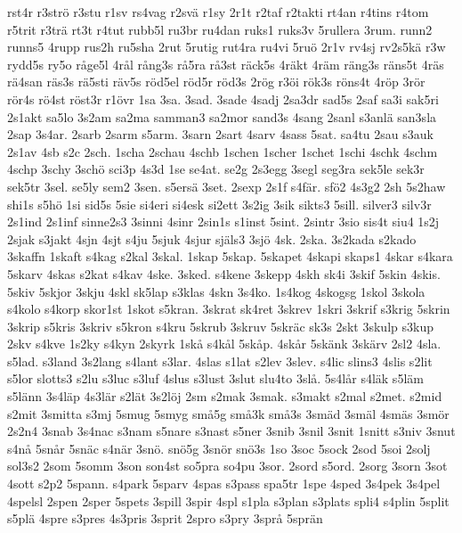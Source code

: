 {{rst4r
r3str^^f6
r3stu
r1sv
rs4vag
r2sv^^e4
r1sy
2r1t
r2taf
r2takti
rt4an
r4tins
r4tom
r5trit
r3tr^^e4
rt3t
r4tut
rubb5l
ru3br
ru4dan
ruks1
ruks3v
5rullera
3rum.
runn2
runns5
4rupp
rus2h
ru5sha
2rut
5rutig
rut4ra
ru4vi
5ru^^f6
2r1v
rv4sj
rv2s5k^^e4
r3w
rydd5s
ry5o
r^^e5ge5l
4r^^e5l
r^^e5ng3s
r^^e55ra
r^^e53st
r^^e4ck5s
4r^^e4kt
4r^^e4m
r^^e4ng3s
r^^e4ns5t
4r^^e4s
r^^e44san
r^^e4s3s
r^^e45sti
r^^e4v5s
r^^f6d5el
r^^f6d5r
r^^f6d3s
2r^^f6g
r3^^f6i
r^^f6k3s
r^^f6ns4t
4r^^f6p
3r^^f6r
r^^f6r4s
r^^f64st
r^^f6st3r
r1^^f6vr
1sa
3sa.
3sad.
3sade
4sadj
2sa3dr
sad5s
2saf
sa3i
sak5ri
2s1akt
sa5lo
3s2am
sa2ma
samman3
sa2mor
sand3s
4sang
2sanl
s3anl^^e4
san3sla
2sap
3s4ar.
2sarb
2sarm
s5arm.
3sarn
2sart
4sarv
4sass
5sat.
sa4tu
2sau
s3auk
2s1av
4sb
s2c
2sch.
1scha
2schau
4schb
1schen
1scher
1schet
1schi
4schk
4schm
4schp
3schy
3sch^^f6
sci3p
4s3d
1se
se4at.
se2g
2s3egg
3segl
seg3ra
sek5le
sek3r
sek5tr
3sel.
se5ly
sem2
3sen.
s5ers^^e4
3set.
2sexp
2s1f
s4f^^e4r.
sf^^f62
4s3g2
2sh
5s2haw
shi1s
s5h^^f6
1si
sid5s
5sie
si4eri
si4esk
si2ett
3s2ig
3sik
sikts3
5sill.
silver3
silv3r
2s1ind
2s1inf
sinne2s3
3sinni
4sinr
2sin1s
s1inst
5sint.
2sintr
3sio
sis4t
siu4
1s2j
2sjak
s3jakt
4sjn
4sjt
s4ju
5sjuk
4sjur
sj^^e4ls3
3sj^^f6
4sk.
2ska.
3s2kada
s2kado
3skaffn
1skaft
s4kag
s2kal
3skal.
1skap
5skap.
5skapet
4skapi
skaps1
4skar
s4kara
5skarv
4skas
s2kat
s4kav
4ske.
3sked.
s4kene
3skepp
4skh
sk4i
3skif
5skin
4skis.
5skiv
5skjor
3skju
4skl
sk5lap
s3klas
4skn
3s4ko.
1s4kog
4skogsg
1skol
3skola
s4kolo
s4korp
skor1st
1skot
s5kran.
3skrat
sk4ret
3skrev
1skri
3skrif
s3krig
5skrin
3skrip
s5kris
3skriv
s5kron
s4kru
5skrub
3skruv
5skr^^e4c
sk3s
2skt
3skulp
s3kup
2skv
s4kve
1s2ky
s4kyn
2skyrk
1sk^^e5
s4k^^e5l
5sk^^e5p.
4sk^^e5r
5sk^^e4nk
3sk^^e4rv
2sl2
4sla.
s5lad.
s3land
3s2lang
s4lant
s3lar.
4slas
s1lat
s2lev
3slev.
s4lic
slins3
4slis
s2lit
s5lor
slotts3
s2lu
s3luc
s3luf
4slus
s3lust
3slut
slu4to
3sl^^e5.
5s4l^^e5r
s4l^^e4k
s5l^^e4m
s5l^^e4nn
3s4l^^e4p
4s3l^^e4r
s2l^^e4t
3s2l^^f6j
2sm
s2mak
3smak.
s3makt
s2mal
s2met.
s2mid
s2mit
3smitta
s3mj
5smug
5smyg
sm^^e55g
sm^^e53k
sm^^e53s
3sm^^e4d
3sm^^e4l
4sm^^e4s
3sm^^f6r
2s2n4
3snab
3s4nac
s3nam
s5nare
s3nast
s5ner
3snib
3snil
3snit
1snitt
s3niv
3snut
s4n^^e5
5sn^^e5r
5sn^^e4c
s4n^^e4r
3sn^^f6.
sn^^f65g
3sn^^f6r
sn^^f63s
1so
3soc
5sock
2sod
5soi
2solj
sol3s2
2som
5somm
3son
son4st
so5pra
so4pu
3sor.
2sord
s5ord.
2sorg
3sorn
3sot
4sott
s2p2
5spann.
s4park
5sparv
4spas
s3pass
spa5tr
1spe
4sped
3s4pek
3s4pel
4spelsl
2spen
2sper
5spets
3spill
3spir
4spl
s1pla
s3plan
s3plats
spli4
s4plin
5split
s5pl^^e4
4spre
s3pres
4s3pris
3sprit
2spro
s3pry
3spr^^e5
5spr^^e4n
}}
